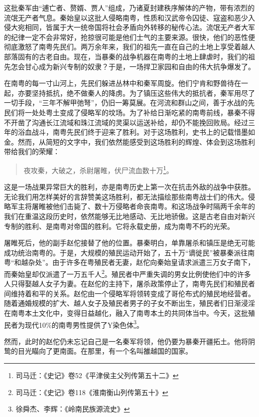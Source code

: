 这批秦军由“逋亡者、赘婿、贾人”组成，乃诸夏封建秩序解体的产物，带有浓烈的流氓无产者气息。秦始皇以这批人侵略南粤，性质和汉武帝令囚徒、寇盗和恶少入侵大宛相同，皆属于大一统帝国将社会矛盾向外转移的秘传心法。流氓无产者大军的纪律一定不会非常好，抢掠很可能是他们士气的主要来源。很快，他们的恶性便彻底激怒了南粤先民们。两万余年来，我们的祖先一直在自己的土地上享受着越人部落固有的古老自由。现在，当暴秦的战争机器在南粤的土地上肆虐时，我们的祖先怎会甘心成为新兴专制的奴隶？于是，一场捍卫家园和自由的伟大抗争爆发了。

在南粤的每一寸山河上，先民们躲进丛林中和秦军周旋。他们宁肯和野兽待在一起，亦要坚持抵抗，绝不做秦人的降虏。为了镇压这些伟大的抵抗者，秦军用尽了一切手段，“三年不解甲弛弩”，仍旧一筹莫展。在河流和群山之间，善于水战的先民们将一处处粤土变成了侵略军的坟场。为了补给日渐吃紧的南粤前线，暴秦不得不开凿了沟通长江流域和珠江流域的灵渠以运送补给，却仍不能挽回败局。经过三年的浴血战斗，南粤先民们终于迎来了胜利。对于这场胜利，史书上的记载惜墨如金。然而，从简短的文字中，我们依然能感受到这场胜利的辉煌、体会到这场胜利带给我们的荣耀：

\begin{quote}
	夜攻秦，大破之，杀尉屠睢，伏尸流血数十万\footnote{司马迁：《史记》卷52《平津侯主父列传第五十二》}。
\end{quote}

这是一场战果异常巨大的胜利，亦是南粤历史上第一次在抗击外敌的战争中获胜。无论我们用怎样美好的言辞赞美这场胜利，都无法描绘那些南粤战士们的伟大。侵略军主将屠睢被他们击毙了、数十万侵略者命丧南粤。和这场战争时隔两千余年的我们在重温这段历史时，依然能够无比地感动、无比地骄傲。这是古老自由对新兴专制的胜利、是南粤对帝国的胜利。它将永载史册，成为南粤不朽的光荣。

屠睢死后，他的副手赵佗接替了他的位置。暴秦明白，单靠屠杀和镇压是绝无可能成功统治南粤的。于是，大规模的殖民运动开始了，五十万“谪徙民”被暴秦派往南粤“和越杂处”。由于许多在粤殖民者无妻，赵佗向秦始皇请求派遣三万女子南下，而秦始皇却仅派遣了一万五千人\footnote{司马迁：《史记》卷118《淮南衡山列传第五十》}。殖民者中严重失调的男女比例使他们中的许多人只得娶越人女子为妻。在赵佗的主持下，屠杀政策停止了，南粤先民们和殖民者间维持着和平的关系。赵佗由一个侵略军将领转变成了哥伦布式的殖民地经营者。随着通婚规模的扩大、越人女子及殖民者男子的子女不断出生，殖民者们日渐浸淫在南粤本土文化中，变得日益越化，融入了南粤本土的共同体当中。今天，这批殖民者为现代10\%的南粤男性提供了Y染色体\footnote{徐舜杰、李辉：《岭南民族源流史》}。

然而，此时的赵佗仍未忘记自己是一名秦军将领，他仍要为暴秦开疆拓土。他将阴鸷的目光瞄向了更南面。在那里，有一个名叫雒越国的国家。

